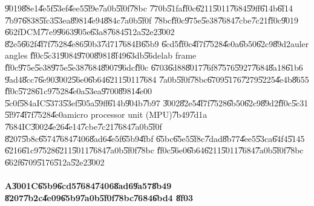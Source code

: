 \U{9019}\U{88e1}\U{4e5f}\U{53ef}\U{4ee5}\U{5f9e}\U{7a0b}\U{5f0f}\U{78bc}%
\U{770b}\U{51fa}\U{ff0c}\U{6211}\U{5011}\U{7684}\U{59ff}\U{614b}\U{6f14}%
\U{7b97}\U{6838}\U{5fc3}\U{53ea}\U{8981}\U{4e94}\U{884c}\U{7a0b}\U{5f0f}%
\U{78bc}\U{ff0c}\U{975e}\U{5e38}\U{7684}\U{7cbe}\U{7c21}\U{ff0c}\U{9019}%
\U{662f}DCM\U{77e9}\U{9663}\U{905e}\U{63a8}\U{7684}\U{512a}\U{52e2}\U{3002}%
\U{82e5}\U{662f}\U{4f7f}\U{7528}\U{4e86}\U{50b3}\U{7d71}\U{7684}B\U{65b9}%
\U{6cd5}\U{ff0c}\U{4f7f}\U{7528}\U{4e0a}\U{6b50}\U{62c9}\U{89d2}auler angles%
\U{ff0c}\U{5c31}\U{9084}\U{9700}\U{8981}\U{8f49}\U{63db}\U{56de}lab frame%
\U{ff0c}\U{975e}\U{5e38}\U{975e}\U{5e38}\U{7684}\U{8907}\U{96dc}\U{ff0c}%
\U{6703}\U{6d88}\U{8017}\U{76f8}\U{7576}\U{5927}\U{7684}\U{8a18}\U{61b6}%
\U{9ad4}\U{8cc7}\U{6e90}\U{3002}\U{56e0}\U{6b64}\U{6211}\U{5011}\U{7684}%
\U{7a0b}\U{5f0f}\U{78bc}\U{6709}\U{5176}\U{7279}\U{5225}\U{4e4b}\U{8655}%
\U{ff0c}\U{5728}\U{61c9}\U{7528}\U{4e0a}\U{53ea}\U{9700}\U{8981}\U{4e00}%
\U{5c0f}\U{584a}IC\U{5373}\U{53ef}\U{505a}\U{59ff}\U{614b}\U{904b}\U{7b97}%
\U{3002}\U{82e5}\U{4f7f}\U{7528}\U{6b50}\U{62c9}\U{89d2}\U{ff0c}\U{5c31}%
\U{5f97}\U{4f7f}\U{7528}\U{4e0a}micro processor unit (MPU)\U{7b49}\U{7d1a}%
\U{7684}IC\U{3002}\U{4e26}\U{4e14}\U{7cbe}\U{7c21}\U{7684}\U{7a0b}\U{5f0f}%
\U{8207}\U{5b8c}\U{6574}\U{7684}\U{7406}\U{8ad6}\U{4e5f}\U{65b9}\U{4fbf}%
\U{65bc}\U{65e5}\U{5f8c}\U{7dad}\U{8b77}\U{4ee5}\U{53ca}\U{64f4}\U{5145}%
\U{6216}\U{61c9}\U{7528}\U{6211}\U{5011}\U{7684}\U{7a0b}\U{5f0f}\U{78bc}%
\U{ff0c}\U{56e0}\U{6b64}\U{6211}\U{5011}\U{7684}\U{7a0b}\U{5f0f}\U{78bc}%
\U{662f}\U{6709}\U{5176}\U{512a}\U{52e2}\U{3002}

\paragraph{A\U{3001}C\U{65b9}\U{6cd5}\U{7684}\U{7406}\U{8ad6}\U{9a57}\U{8b49}%
\U{8207}\U{7b2c}\U{4e09}\U{65b9}\U{7a0b}\U{5f0f}\U{78bc}\U{7684}\U{6bd4}%
\U{8f03}}

